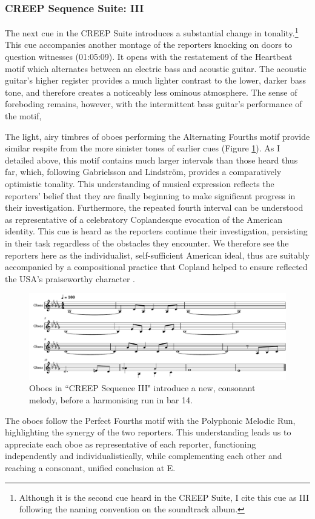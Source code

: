 \subsubsection{CREEP Sequence Suite: III}

The next cue in the CREEP Suite introduces a substantial change in tonality.\footnote{Although it is the second cue heard in the CREEP Suite, I cite this cue as III following the naming convention on the soundtrack album.}
This cue accompanies another montage of the reporters knocking on doors to question witnesses (01:05:09).
It opens with the restatement of the Heartbeat motif which alternates between an electric bass and acoustic guitar.
The acoustic guitar's higher register provides a much lighter contrast to the lower, darker bass tone, and therefore creates a noticeably less ominous atmosphere.
The sense of foreboding remains, however, with the intermittent bass guitar's performance of the motif, 

The light, airy timbres of oboes performing the Alternating Fourths motif provide similar respite from the more sinister tones of earlier cues (Figure \ref{fig:president-creep-3}).
As I detailed above, this motif contains much larger intervals than those heard thus far, which, following Gabrielsson and Lindström, provides a comparatively optimistic tonality.
This understanding of musical expression reflects the reporters' belief that they are finally beginning to make significant progress in their investigation. 
Furthermore, the repeated fourth interval can be understood as representative of a celebratory Coplandesque evocation of the American identity.
This cue is heard as the reporters continue their investigation, persisting in their task regardless of the obstacles they encounter.
We therefore see the reporters here as the individualist, self-sufficient American ideal, thus are suitably accompanied by a compositional practice that Copland helped to ensure reflected the USA's praiseworthy character .
\begin{figure}
    \centering
    \includegraphics[width=1\linewidth]{img/president-creep-3.pdf}
    \caption{Oboes in ``CREEP Sequence III" introduce a new, consonant melody, before a harmonising run in bar 14.}
    \label{fig:president-creep-3}
\end{figure}
The oboes follow the Perfect Fourths motif with the Polyphonic Melodic Run, highlighting the synergy of the two reporters.
This understanding leads us to appreciate each oboe as representative of each reporter, functioning independently and individualistically, while complementing each other and reaching a consonant, unified conclusion at E\flat.


